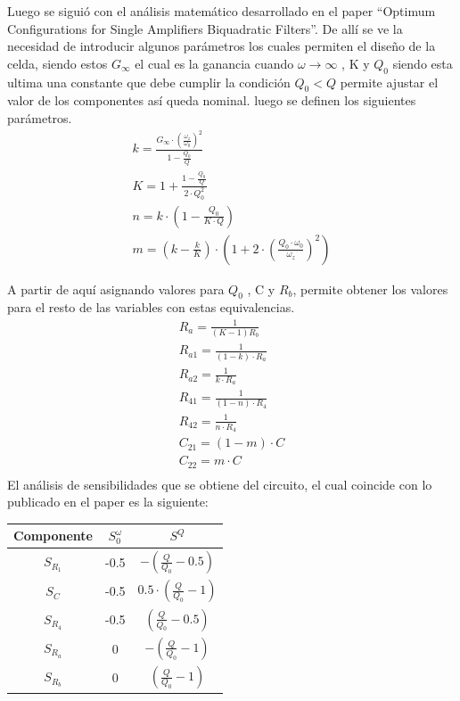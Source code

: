 Luego se siguió con el análisis matemático desarrollado en el paper ``Optimum Configurations for Single Amplifiers Biquadratic Filters''.
De allí se ve la necesidad de introducir algunos parámetros los cuales permiten el diseño de la celda, siendo estos $G_\infty$ el cual es la ganancia cuando $\omega \rightarrow \infty$ , K y $Q_0$ siendo esta ultima una constante que debe cumplir la condición $Q_0 < Q$ permite ajustar el valor de los componentes así queda nominal.  luego se definen los siguientes parámetros. 
\begin{align}
k=\frac{G_\infty\cdot \left(\frac{\omega_z}{\omega_0} \right)^2}{1-\frac{Q_0}{Q}}\\
K=1+\frac{1-\frac{Q_0}{Q}}{2\cdot Q_0^2}\\
n= k\cdot (1-\frac{Q_0 }{K\cdot Q})\\
m=  \left( k-\frac{k}{K} \right) \cdot \left(1+2\cdot \left(\frac{Q_0\cdot \omega_0}{\omega_z}\right)^2 \right)  
\end{align}

A partir de aquí asignando valores para $Q_0$ , C y $R_b$, permite obtener los valores para el resto de las variables con estas equivalencias.  
\begin{align}
	R_a= \frac{1}{(K-1) R_b}\\
	R_{a1}=\frac{1}{(1-k)\cdot R_a}\\
	R_{a2}=\frac{1}{k \cdot R_a}\\
	R_{41}=	\frac{1}{(1-n)\cdot R_4}\\
	R_{42}=	\frac{1}{n\cdot R_4}\\
	C_{21} = (1-m) \cdot C\\
	C_{22} = m \cdot C\\
\end{align}
El análisis de sensibilidades que se obtiene del circuito, el cual coincide con lo publicado en el paper es la siguiente: 
\begin{table}[H]
\centering
\begin{tabular}{ccc}
Componente & $S^\omega_0$ & $S^Q$                                      \\ \hline
$S_{R_1}$  & -0.5         & $-\left( \frac{Q}{Q_0} -0.5 \right)$       \\
$S_{C}$    & -0.5         & $0.5\cdot \left( \frac{Q}{Q_0} -1 \right)$ \\
$S_{R_4}$  & -0.5         & $\left( \frac{Q}{Q_0} -0.5 \right)$        \\
$S_{R_a}$  & 0            & $-\left( \frac{Q}{Q_0} -1 \right)$         \\
$S_{R_b}$  & 0            & $\left( \frac{Q}{Q_0} -1 \right)$         
\end{tabular}
\end{table}


